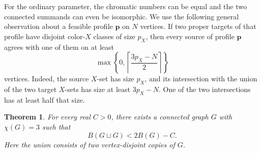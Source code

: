 \documentclass[10pt,a4paper]{amsart}
\numberwithin{equation}{section}
\newtheorem{theorem}{Theorem}[section]
\theoremstyle{definition}
\theoremstyle{remark}
\begin{document}
For the ordinary parameter, the chromatic numbers can be equal and
the two connected summands can even be isomorphic. We use the following
general observation about a feasible profile $\mathbf p$ on $N$ vertices.
If two proper targets of that profile have disjoint color-$X$ classes
of size $p_X$, then every source of profile $\mathbf p$ agrees with one
of them on at least
\begin{equation}\label{union:disjoint-class-bound}
 \max\left\{0,\left\lceil\frac{3p_X-N}{2}\right\rceil\right\}
\end{equation}
vertices. Indeed, the source $X$-set has size $p_X$, and its intersection
with the union of the two target $X$-sets has size at least $3p_X-N$.
One of the two intersections has at least half that size.

\begin{theorem}\label{union:strong-counterexample}
For every real $C>0$, there exists a connected graph $G$ with
$\chi(G)=3$ such that
\[
 B(G\sqcup G)<2B(G)-C.
\]
Here the union consists of two vertex-disjoint copies of $G$.
\end{theorem}
\end{document}
